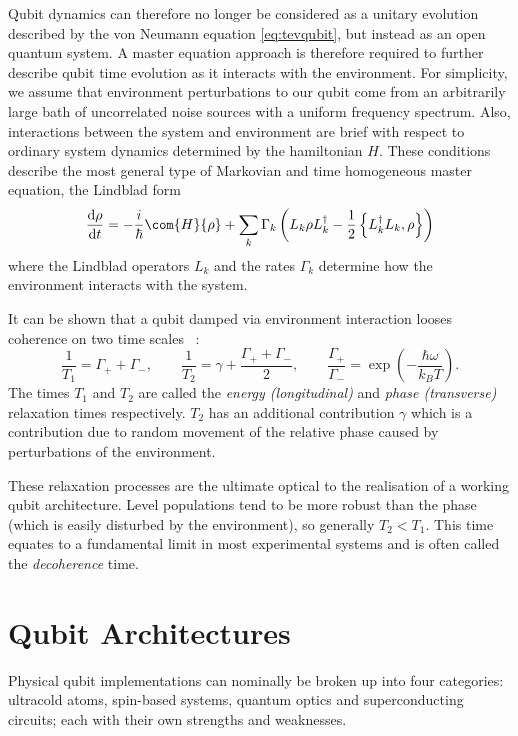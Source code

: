 Qubit dynamics can therefore no longer be considered as a unitary evolution described by the von Neumann equation \cref{eq:tevqubit}, but instead as an open quantum system.
A master equation approach is therefore required to further describe qubit time evolution as it interacts with the environment.
For simplicity, we assume that environment perturbations to our qubit come from an arbitrarily large bath of uncorrelated noise sources with a uniform frequency spectrum.
Also, interactions between the system and environment are brief with respect to ordinary system dynamics determined by the hamiltonian $H$.
These conditions describe the most general type of Markovian and time homogeneous master equation, the Lindblad form~\cite{Lindblad1976}
\begin{equation}
\frac{\mathrm{d}\rho}{\mathrm{d}t} =-\frac{i}{\hbar}\com{H}{\rho}+\sum_{k} \Gamma_k\left(L_k\rho L_k^\dagger-\frac{1}{2}\left\{L_k^\dagger L_k, \rho\right\}\right)
\end{equation}
where the Lindblad operators $L_k$ and the rates $\Gamma_k$ determine
how the environment interacts with the system.

It can be shown that a qubit damped via environment interaction looses coherence on two time scales ~\cite{Stenholm2005}:
\begin{equation}
\frac{1}{T_1} = \Gamma_+ + \Gamma_-, \qquad \frac{1}{T_2} = \gamma + \frac{\Gamma_+ + \Gamma_-}{2}, \qquad \frac{\Gamma_+}{\Gamma_-} = \exp\left(-\frac{\hbar \omega}{k_B T}\right).
\end{equation}
The times $T_1$ and $T_2$ are called the \textit{energy (longitudinal)} and \textit{phase (transverse)} relaxation times respectively.
$T_2$ has an additional contribution $\gamma$ which is a contribution due to random movement of the relative phase caused by perturbations of the environment.

These relaxation processes are the ultimate optical to the realisation of a working qubit architecture.
Level populations tend to be more robust than the phase (which is easily disturbed by the environment), so generally $T_2 < T_1$.
This time equates to a fundamental limit in most experimental systems and is often called the \textit{decoherence} time.

\section{Qubit Architectures}
Physical qubit implementations can nominally be broken up into four categories: ultracold atoms, spin-based systems, quantum optics and superconducting circuits; each with their own strengths and weaknesses.


